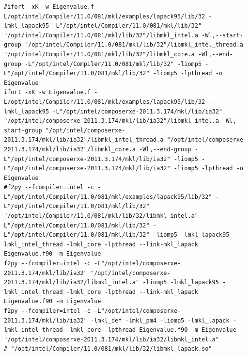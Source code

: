 \begin{verbatim}
#ifort -xK -w Eigenvalue.f -L/opt/intel/Compiler/11.0/081/mkl/examples/lapack95/lib/32 -lmkl_lapack95 -L"/opt/intel/Compiler/11.0/081/mkl/lib/32" "/opt/intel/Compiler/11.0/081/mkl/lib/32"/libmkl_intel.a -Wl,--start-group "/opt/intel/Compiler/11.0/081/mkl/lib/32"/libmkl_intel_thread.a "/opt/intel/Compiler/11.0/081/mkl/lib/32"/libmkl_core.a -Wl,--end-group -L"/opt/intel/Compiler/11.0/081/mkl/lib/32" -liomp5 -L"/opt/intel/Compiler/11.0/081/mkl/lib/32" -liomp5 -lpthread -o Eigenvalue
ifort -xK -w Eigenvalue.f -L/opt/intel/Compiler/11.0/081/mkl/examples/lapack95/lib/32 -lmkl_lapack95 -L"/opt/intel/composerxe-2011.3.174/mkl/lib/ia32" "/opt/intel/composerxe-2011.3.174/mkl/lib/ia32"/libmkl_intel.a -Wl,--start-group "/opt/intel/composerxe-2011.3.174/mkl/lib/ia32"/libmkl_intel_thread.a "/opt/intel/composerxe-2011.3.174/mkl/lib/ia32"/libmkl_core.a -Wl,--end-group -L"/opt/intel/composerxe-2011.3.174/mkl/lib/ia32" -liomp5 -L"/opt/intel/composerxe-2011.3.174/mkl/lib/ia32" -liomp5 -lpthread -o Eigenvalue
#f2py --fcompiler=intel -c -L"/opt/intel/Compiler/11.0/081/mkl/examples/lapack95/lib/32" -L"/opt/intel/Compiler/11.0/081/mkl/lib/32" "/opt/intel/Compiler/11.0/081/mkl/lib/32/libmkl_intel.a" -L"/opt/intel/Compiler/11.0/081/mkl/lib/32" -L"/opt/intel/Compiler/11.0/081/mkl/lib/32" -liomp5 -lmkl_lapack95 -lmkl_intel_thread -lmkl_core -lpthread --link-mkl_lapack Eigenvalue.f90 -m Eigenvalue
f2py --fcompiler=intel -c -L"/opt/intel/composerxe-2011.3.174/mkl/lib/ia32" "/opt/intel/composerxe-2011.3.174/mkl/lib/ia32/libmkl_intel.a" -liomp5 -lmkl_lapack95 -lmkl_intel_thread -lmkl_core -lpthread --link-mkl_lapack Eigenvalue.f90 -m Eigenvalue
f2py --fcompiler=intel -c -L"/opt/intel/composerxe-2011.3.174/mkl/lib/ia32" -lmkl_def -lmkl_pm4 -liomp5 -lmkl_lapack -lmkl_intel_thread -lmkl_core -lpthread Eigenvalue.f90 -m Eigenvalue "/opt/intel/composerxe-2011.3.174/mkl/lib/ia32/libmkl_intel.a"
# "/opt/intel/Compiler/11.0/081/mkl/lib/32/libmkl_lapack.so"
\end{verbatim}
